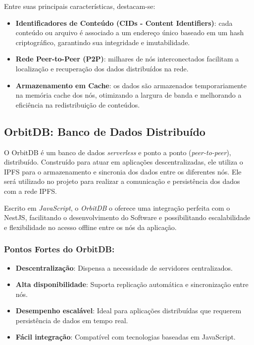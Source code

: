 Entre suas principais características, destacam-se:

\begin{itemize}
    \item \textbf{Identificadores de Conteúdo (CIDs - Content Identifiers)}: cada conteúdo ou arquivo é associado a um endereço único baseado em um hash criptográfico, garantindo sua integridade e imutabilidade.
    
    \item \textbf{Rede Peer-to-Peer (P2P)}: milhares de nós interconectados facilitam a localização e recuperação dos dados distribuídos na rede.
    
    \item \textbf{Armazenamento em Cache}: os dados são armazenados temporariamente na memória cache dos nós, otimizando a largura de banda e melhorando a eficiência na redistribuição de conteúdos.
\end{itemize}

\subsection{OrbitDB: Banco de Dados Distribuído}

O OrbitDB é um banco de dados \textit{serverless} e ponto a ponto (\textit{peer-to-peer}), distribuído. Construído para atuar em aplicações descentralizadas, ele utiliza o IPFS para o armazenamento e sincronia dos dados entre os diferentes nós. Ele será utilizado no projeto para realizar a comunicação e persistência dos dados com a rede IPFS.

Escrito em \textit{JavaScript}, o \textit{OrbitDB} o oferece uma integração perfeita com o NestJS, facilitando o desenvolvimento do Software e possibilitando escalabilidade e flexibilidade no acesso offline entre os nós da aplicação.

\subsubsection*{Pontos Fortes do OrbitDB:}
\begin{itemize}
    \item \textbf{Descentralização}: Dispensa a necessidade de servidores centralizados.
    \item \textbf{Alta disponibilidade}: Suporta replicação automática e sincronização entre nós.
    \item \textbf{Desempenho escalável}: Ideal para aplicações distribuídas que requerem persistência de dados em tempo real.
    \item \textbf{Fácil integração}: Compatível com tecnologias baseadas em JavaScript.
\end{itemize}

